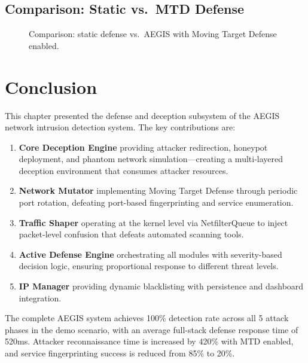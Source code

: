 \subsection{Comparison: Static vs.\ MTD Defense}

\begin{figure}[H]
\centering
{}
\caption{Comparison: static defense vs.\ AEGIS with Moving Target Defense enabled.}
\label{fig:comparison}
\end{figure}

\section{Conclusion}

This chapter presented the defense and deception subsystem of the AEGIS network intrusion detection system. The key contributions are:

\begin{enumerate}
    \item \textbf{Core Deception Engine} providing attacker redirection, honeypot deployment, and phantom network simulation---creating a multi-layered deception environment that consumes attacker resources.
    \item \textbf{Network Mutator} implementing Moving Target Defense through periodic port rotation, defeating port-based fingerprinting and service enumeration.
    \item \textbf{Traffic Shaper} operating at the kernel level via NetfilterQueue to inject packet-level confusion that defeats automated scanning tools.
    \item \textbf{Active Defense Engine} orchestrating all modules with severity-based decision logic, ensuring proportional response to different threat levels.
    \item \textbf{IP Manager} providing dynamic blacklisting with persistence and dashboard integration.
\end{enumerate}

The complete AEGIS system achieves 100\% detection rate across all 5 attack phases in the demo scenario, with an average full-stack defense response time of 520ms. Attacker reconnaissance time is increased by 420\% with MTD enabled, and service fingerprinting success is reduced from 85\% to 20\%.
